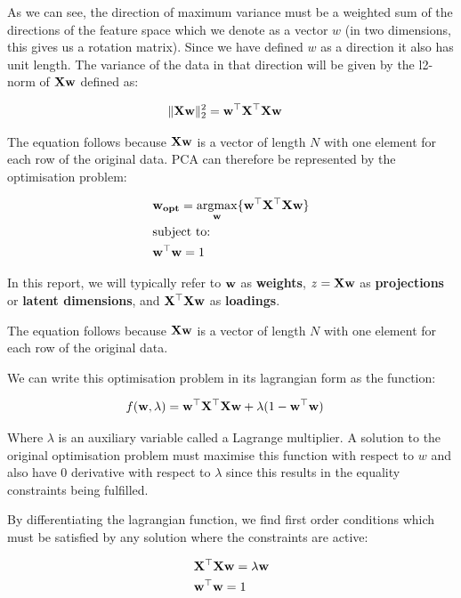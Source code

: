 As we can see, the direction of maximum variance must be a weighted sum of the directions of the feature space which we denote as a vector $w$ (in two dimensions, this gives us a rotation matrix). Since we have defined $w$ as a direction it also has unit length. The variance of the data in that direction will be given by the l2-norm of $\bold{Xw}$ defined as:

\begin{align}
    & \|\bold{Xw}\|^2_2=\bold{w^{\top}X^{\top}}\bold{Xw}
\end{align}

The equation follows because $\bold{Xw}$ is a vector of length $N$ with one element for each row of the original data. PCA can therefore be represented by the optimisation problem:

\begin{align}
    & \bold{w_{opt}}=\underset{\bold{w}}{\mathrm{argmax}}\{\bold{w^{\top}X^{\top}}\bold{Xw}\}\\
    & \text{subject to:} \notag\\
    & \bold{w^{\top}w}=1 \notag 
\end{align}

In this report, we will typically refer to $\bold{w}$ as \textbf{weights}, $z=\bold{Xw}$ as \textbf{projections} or \textbf{latent dimensions}, and $\bold{X^{\top}Xw}$ as \textbf{loadings}.

The equation follows because $\bold{Xw}$ is a vector of length $N$ with one element for each row of the original data. 

We can write this optimisation problem in its lagrangian form as the function:

\begin{align}
    & f(\bold{w},\lambda)=\bold{w^{\top}X^{\top}}\bold{Xw} + \lambda(1-\bold{w^{\top}w})
\end{align}

Where $\lambda$ is an auxiliary variable called a Lagrange multiplier. A solution to the original optimisation problem must maximise this function with respect to $w$ and also have 0 derivative with respect to $\lambda$ since this results in the equality constraints being fulfilled. 

By differentiating the lagrangian function, we find first order conditions which must be satisfied by any solution where the constraints are active:

\begin{align}
    & \bold{X^{\top}}\bold{Xw}=\lambda \bold{w}\\
    & \bold{w^{\top}w}=1
\end{align}

